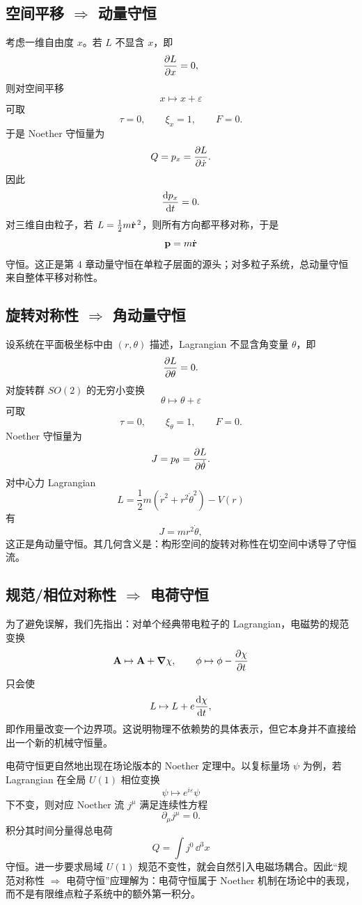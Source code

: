 \subsection{空间平移 $\Rightarrow$ 动量守恒}

考虑一维自由度 $x$。若 $L$ 不显含 $x$，即
\[
  \pdv{L}{x}=0,
\]
则对空间平移
\[
  x\mapsto x+\varepsilon
\]
可取
\[
  \tau=0,
  \qquad
  \xi_x=1,
  \qquad
  F=0.
\]
于是 Noether 守恒量为
\[
  Q=p_x=\pdv{L}{\dot x}.
\]
因此
\[
  \dv{p_x}{t}=0.
\]
对三维自由粒子，若 $L=\frac12 m\dot{\vb r}^{\,2}$，则所有方向都平移对称，于是
\[
  \vb p = m\dot{\vb r}
\]
守恒。这正是第 4 章动量守恒在单粒子层面的源头；对多粒子系统，总动量守恒来自整体平移对称性。

\subsection{旋转对称性 $\Rightarrow$ 角动量守恒}

设系统在平面极坐标中由 $(r,\theta)$ 描述，Lagrangian 不显含角变量 $\theta$，即
\[
  \pdv{L}{\theta}=0.
\]
对旋转群 $SO(2)$ 的无穷小变换
\[
  \theta\mapsto \theta+\varepsilon
\]
可取
\[
  \tau=0,
  \qquad
  \xi_\theta=1,
  \qquad
  F=0.
\]
Noether 守恒量为
\[
  J=p_\theta=\pdv{L}{\dot\theta}.
\]
对中心力 Lagrangian
\[
  L=\frac12 m(\dot r^2+r^2\dot\theta^2)-V(r)
\]
有
\[
  J=mr^2\dot\theta,
\]
这正是角动量守恒。其几何含义是：构形空间的旋转对称性在切空间中诱导了守恒流。

\subsection{规范/相位对称性 $\Rightarrow$ 电荷守恒}

为了避免误解，我们先指出：对单个经典带电粒子的 Lagrangian，电磁势的规范变换
\[
  \vb A\mapsto \vb A+\grad \chi,
  \qquad
  \phi\mapsto \phi-\pdv{\chi}{t}
\]
只会使
\[
  L\mapsto L+e\dv{\chi}{t},
\]
即作用量改变一个边界项。这说明物理不依赖势的具体表示，但它本身并不直接给出一个新的机械守恒量。

电荷守恒更自然地出现在场论版本的 Noether 定理中。以复标量场 $\psi$ 为例，若 Lagrangian 在全局 $U(1)$ 相位变换
\[
  \psi\mapsto e^{i\varepsilon}\psi
\]
下不变，则对应 Noether 流 $j^\mu$ 满足连续性方程
\[
  \partial_\mu j^\mu =0.
\]
积分其时间分量得总电荷
\[
  Q=\int j^0\,\dd^3x
\]
守恒。进一步要求局域 $U(1)$ 规范不变性，就会自然引入电磁场耦合。因此“规范对称性 $\Rightarrow$ 电荷守恒”应理解为：电荷守恒属于 Noether 机制在场论中的表现，而不是有限维点粒子系统中的额外第一积分。

